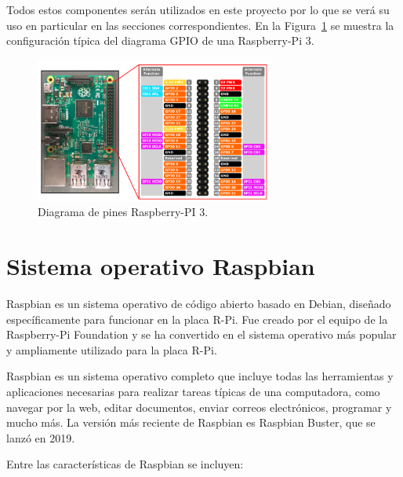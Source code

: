Todos estos componentes serán utilizados en este proyecto por lo que se verá su uso en particular en las secciones correspondientes. En la Figura~\ref{fig:pinesRaspberry} se muestra la configuración típica del diagrama GPIO de una Raspberry-Pi 3.

\vspace{2mm}
\begin{figure}[t]
\centering
\includegraphics[width=0.7\textwidth]{images/esquemaRaspberry.png}
\caption{Diagrama de pines Raspberry-PI 3.}%
\label{fig:pinesRaspberry}
\end{figure}


\section{Sistema operativo Raspbian}

Raspbian es un sistema operativo de código abierto basado en Debian, diseñado específicamente para funcionar en la placa R-Pi. Fue creado por el equipo de la Raspberry-Pi Foundation y se ha convertido en el sistema operativo más popular y ampliamente utilizado para la placa R-Pi.

Raspbian es un sistema operativo completo que incluye todas las herramientas y aplicaciones necesarias para realizar tareas típicas de una computadora, como navegar por la web, editar documentos, enviar correos electrónicos, programar y mucho más. La versión más reciente de Raspbian es Raspbian Buster, que se lanzó en 2019.

Entre las características de Raspbian se incluyen:


